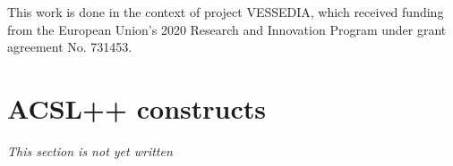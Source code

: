 \documentclass[web]{frama-c-book}
\newcommand{\acslpp}{\textsc{ACSL++}\xspace}
\begin{document}
This work is done in the context of project VESSEDIA,
which received funding from the European Union's 2020
Research and Innovation Program under grant agreement
No. 731453.









\section{\acslpp constructs}

\textit{This section is not yet written}


\appendix




\cleardoublepage
{}






\cleardoublepage
{}
\printindex
\end{document}
